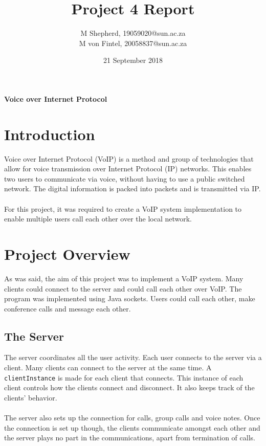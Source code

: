 \documentclass[13pt]{article}
\begin{document}
\title{Project 4 Report}
\author{M Shepherd, 19059020@sun.ac.za \\ M von Fintel, 20058837@sun.ac.za}
\date{21 September 2018}

\maketitle

\centerline{\textbf{Voice over Internet Protocol}}

\newpage
\tableofcontents
\newpage

\section{Introduction}

Voice over Internet Protocol (VoIP) is a method and group of technologies that allow for voice transmission over Internet Protocol (IP) networks. This enables two users to communicate via voice, without having to use a public switched network. The digital information is packed into packets and is transmitted via IP.
\\\\
For this project, it was required to create a VoIP system implementation to enable multiple users call each other over the local network.

\section{Project Overview}

As was said, the aim of this project was to implement a VoIP system. Many clients could connect to the server and could call each other over VoIP. The program was implemented using Java sockets. Users could call each other, make conference calls and message each other.

\subsection{The Server}

The server coordinates all the user activity. Each user connects to the server via a client. Many clients can connect to the server at the same time. A \texttt{clientInstance} is made for each client that connects. This instance of each client controls how the clients connect and disconnect. It also keeps track of the clients' behavior.
\\\\
The server also sets up the connection for calls, group calls and voice notes. Once the connection is set up though, the clients communicate amongst each other and the server plays no part in the communications, apart from termination of calls.
\end{document}
